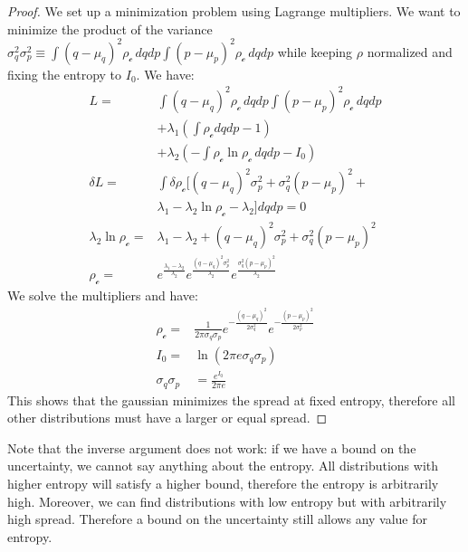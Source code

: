 \documentclass[10pt,twocolumn, nofootinbib]{revtex4-2}
\begin{document}
\begin{proof}
	We set up a minimization problem using Lagrange multipliers. We want to minimize the product of the variance $\sigma_q^2 \sigma_p^2 \equiv \int (q-\mu_q)^2 \rho_{\mathcal{c}} \, dqdp \int (p-\mu_p)^2 \rho_{\mathcal{c}} \, dqdp$ while keeping $\rho$ normalized and fixing the entropy to $I_0$. We have: 
	\begin{align*}
		L = &\int (q-\mu_q)^2 \rho_{\mathcal{c}} \, dqdp \int (p-\mu_p)^2 \rho_{\mathcal{c}} \, dqdp \\
		&+ \lambda_1(\int \rho_{\mathcal{c}} dqdp - 1) \\ &+ \lambda_2(- \int \rho_{\mathcal{c}} \ln \rho_{\mathcal{c}} \, dqdp - I_0)\\
		\delta L = &\int \delta \rho_{\mathcal{c}} [(q-\mu_q)^2 \sigma_p^2 + \sigma_q^2 (p-\mu_p)^2 + \\ &\lambda_1 - \lambda_2 \ln \rho_{\mathcal{c}} - \lambda_2 ] dqdp = 0 \\
		\lambda_2 \ln \rho_{\mathcal{c}} = &\lambda_1 - \lambda_2 + (q-\mu_q)^2 \sigma_p^2 + \sigma_q^2 (p-\mu_p)^2 \\
		\rho_{\mathcal{c}} = &e^{\frac{\lambda_1 - \lambda_2}{\lambda_2}}e^{\frac{(q-\mu_q)^2 \sigma_p^2}{\lambda_2}}e^{\frac{\sigma_q^2 (p-\mu_p)^2}{\lambda_2}}
	\end{align*}
	We solve the multipliers and have:
	\begin{align*}
		\rho_{\mathcal{c}} = &\frac{1}{ 2 \pi \sigma_q \sigma_p} e^{-\frac{(q-\mu_q)^2}{2\sigma_q^2}} e^{-\frac{(p-\mu_p)^2}{2\sigma_p^2}} \\
		I_0 = &\ln (2\pi e\sigma_q\sigma_p) \\
		\sigma_q \sigma_p &= \frac{e^{I_0}}{2 \pi e}
	\end{align*}
	This shows that the gaussian minimizes the spread at fixed entropy, therefore all other distributions must have a larger or equal spread. 
\end{proof}

\begin{remark}
	Note that the inverse argument does not work: if we have a bound on the uncertainty, we cannot say anything about the entropy. All distributions with higher entropy will satisfy a higher bound, therefore the entropy is arbitrarily high. Moreover, we can find distributions with low entropy but with arbitrarily high spread. Therefore a bound on the uncertainty still allows any value for entropy.
\end{remark}


\end{document}

